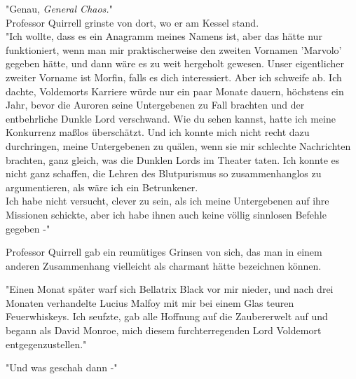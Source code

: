{"Genau, \emph{General Chaos.}"\\ Professor Quirrell grinste von dort, wo er am Kessel stand.\\ "Ich wollte, dass es ein Anagramm meines Namens ist, aber das hätte nur funktioniert, wenn man mir praktischerweise den zweiten Vornamen 'Marvolo' gegeben hätte, und dann wäre es zu weit hergeholt gewesen. Unser eigentlicher zweiter Vorname ist Morfin, falls es dich interessiert. Aber ich schweife ab. Ich dachte, Voldemorts Karriere würde nur ein paar Monate dauern, höchstens ein Jahr, bevor die Auroren seine Untergebenen zu Fall brachten und der entbehrliche Dunkle Lord verschwand. Wie du sehen kannst, hatte ich meine Konkurrenz maßlos überschätzt. Und ich konnte mich nicht recht dazu durchringen, meine Untergebenen zu quälen, wenn sie mir schlechte Nachrichten brachten, ganz gleich, was die Dunklen Lords im Theater taten. Ich konnte es nicht ganz schaffen, die Lehren des Blutpurismus so zusammenhanglos zu argumentieren, als wäre ich ein Betrunkener.\\ Ich habe nicht versucht, clever zu sein, als ich meine Untergebenen auf ihre Missionen schickte, aber ich habe ihnen auch keine völlig sinnlosen Befehle gegeben -"

Professor Quirrell gab ein reumütiges Grinsen von sich, das man in einem anderen Zusammenhang vielleicht als charmant hätte bezeichnen können.

"Einen Monat später warf sich Bellatrix Black vor mir nieder, und nach drei Monaten verhandelte Lucius Malfoy mit mir bei einem Glas teuren Feuerwhiskeys. Ich seufzte, gab alle Hoffnung auf die Zaubererwelt auf und begann als David Monroe, mich diesem furchterregenden Lord Voldemort entgegenzustellen."

"Und was geschah dann -"

}
